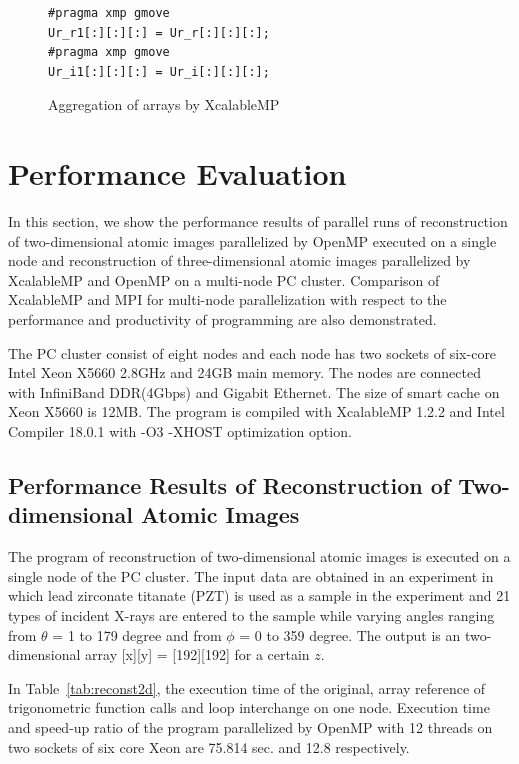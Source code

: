\documentclass[graybox,vecphys]{svmult}
\begin{document}
\begin{figure}[tb]
\begin{verbatim}
#pragma xmp gmove
Ur_r1[:][:][:] = Ur_r[:][:][:];
#pragma xmp gmove
Ur_i1[:][:][:] = Ur_i[:][:][:];
\end{verbatim}
\begin{center}
  \caption{Aggregation of arrays by XcalableMP}\label{fig:aggregation}
\end{center}
\end{figure}

\section{Performance Evaluation}\label{sec:results}
In this section, we show the performance results of parallel runs
of reconstruction of two-dimensional atomic images parallelized by OpenMP
executed on a single node and reconstruction of three-dimensional atomic images
parallelized by XcalableMP and OpenMP on a multi-node PC cluster.
Comparison of XcalableMP and MPI for multi-node parallelization
with respect to the performance and productivity of programming are
also demonstrated.

The PC cluster consist of eight nodes and each node has two sockets of
six-core Intel Xeon X5660 2.8GHz and 24GB main memory. The nodes are
connected with InfiniBand DDR(4Gbps) and Gigabit Ethernet. The size of
smart cache on Xeon X5660 is 12MB. The program is compiled with XcalableMP
1.2.2 and Intel Compiler 18.0.1 with -O3 -XHOST optimization option.

\subsection{Performance Results of Reconstruction of Two-dimensional Atomic Images}
The program of reconstruction of two-dimensional atomic images is
executed on a single node of the PC cluster. The input data are
obtained in an experiment in which lead zirconate titanate (PZT) is
used as a sample in the experiment and 21 types of incident X-rays are
entered to the sample while varying angles ranging from $\theta$ = 1
to 179 degree and from $\phi$ = 0 to 359 degree. The output is an
two-dimensional array [x][y] = [192][192] for a certain $z$.

In Table~\ref{tab:reconst2d}, the execution time of the original,
array reference of trigonometric function calls and loop interchange on
one node.  Execution time and speed-up ratio of the program
parallelized by OpenMP with 12 threads on two sockets of six core Xeon
are 75.814 sec. and 12.8 respectively.
\end{document}

